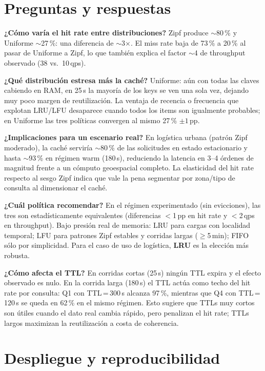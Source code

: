 \documentclass[11pt,a4paper]{article}
\begin{document}
\section{Preguntas y respuestas}

\textbf{¿Cómo varía el hit rate entre distribuciones?} Zipf produce
$\sim$80\,\% y Uniforme $\sim$27\,\%: una diferencia de $\sim$3$\times$.
El miss rate baja de 73\,\% a 20\,\% al pasar de Uniforme a Zipf, lo que
también explica el factor $\sim$4 de throughput observado (38 vs.\ 10\,qps).

\textbf{¿Qué distribución estresa más la caché?} Uniforme: aún con todas
las claves cabiendo en RAM, en 25\,s la mayoría de los keys se ven una sola
vez, dejando muy poco margen de reutilización. La ventaja de recencia o
frecuencia que explotan LRU/LFU desaparece cuando todos los items son
igualmente probables; en Uniforme las tres políticas convergen al mismo
27\,\% $\pm 1$\,pp.

\textbf{¿Implicaciones para un escenario real?} En logística urbana (patrón
Zipf moderado), la caché serviría $\sim$80\,\% de las solicitudes en estado
estacionario y hasta $\sim$93\,\% en régimen warm (180\,s), reduciendo la
latencia en 3--4 órdenes de magnitud frente a un cómputo geoespacial
completo. La elasticidad del hit rate respecto al sesgo Zipf indica que
vale la pena segmentar por zona/tipo de consulta al dimensionar el caché.

\textbf{¿Cuál política recomendar?} En el régimen experimentado (sin
evicciones), las tres son estadísticamente equivalentes (diferencias
$<$1\,pp en hit rate y $<$2\,qps en throughput). Bajo presión real de
memoria: LRU para cargas con localidad temporal; LFU para patrones Zipf
estables y corridas largas ($\geq$5\,min); FIFO sólo por simplicidad. Para
el caso de uso de logística, \textbf{LRU} es la elección más robusta.

\textbf{¿Cómo afecta el TTL?} En corridas cortas (25\,s) ningún TTL expira
y el efecto observado es nulo. En la corrida larga (180\,s) el TTL actúa
como techo del hit rate por consulta: Q1 con TTL\,=\,300\,s alcanza 97\,\%,
mientras que Q4 con TTL\,=\,120\,s se queda en 62\,\% en el mismo régimen.
Esto sugiere que TTLs muy cortos son útiles cuando el dato real cambia
rápido, pero penalizan el hit rate; TTLs largos maximizan la reutilización
a costa de coherencia.

\section{Despliegue y reproducibilidad}
\end{document}
